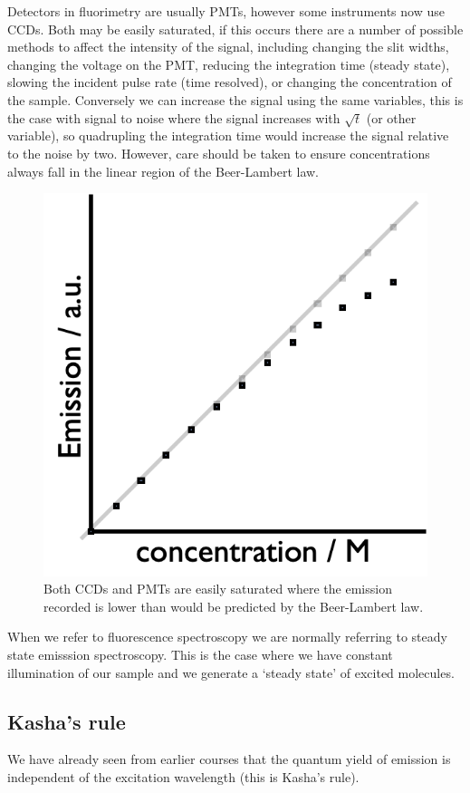 \documentclass[
]{book}
\begin{document}
Detectors in fluorimetry are usually PMTs, however some instruments now use CCDs. Both may be easily saturated, if this occurs there are a number of possible methods to affect the intensity of the signal, including changing the slit widths, changing the voltage on the PMT, reducing the integration time (steady state), slowing the incident pulse rate (time resolved), or changing the concentration of the sample. Conversely we can increase the signal using the same variables, this is the case with signal to noise where the signal increases with \(\sqrt{t}\) (or other variable), so quadrupling the integration time would increase the signal relative to the noise by two. However, care should be taken to ensure concentrations always fall in the linear region of the Beer-Lambert law.

\begin{figure}

{\centering \includegraphics[width=0.4\linewidth]{images/saturation} 

}

\caption{Both CCDs and PMTs are easily saturated where the emission recorded is lower than would be predicted by the Beer-Lambert law.}\label{fig:saturation}
\end{figure}

When we refer to fluorescence spectroscopy we are normally referring to steady state emisssion spectroscopy. This is the case where we have constant illumination of our sample and we generate a `steady state' of excited molecules.

\hypertarget{kashas-rule}{%
\subsection{Kasha's rule}\label{kashas-rule}}

We have already seen from earlier courses that the quantum yield of emission is independent of the excitation wavelength (this is Kasha's rule).
\end{document}
